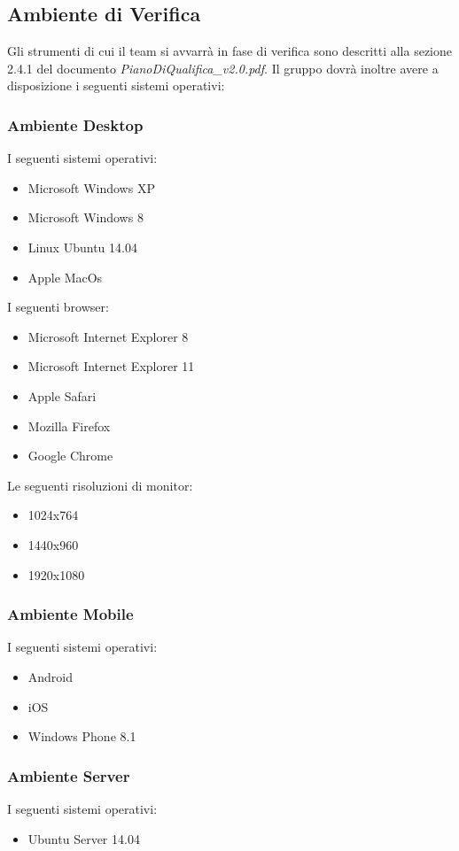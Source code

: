 \subsection{Ambiente di Verifica}
Gli strumenti di cui il team si avvarrà in fase di verifica sono descritti alla sezione 2.4.1 del documento \textit{PianoDiQualifica\_v2.0.pdf}.
Il gruppo dovrà inoltre avere a disposizione i seguenti sistemi operativi:

\subsubsection{Ambiente Desktop}
I seguenti sistemi operativi:
\begin{itemize}
\item Microsoft Windows XP
\item Microsoft Windows 8
\item Linux Ubuntu 14.04
\item Apple MacOs 
\end{itemize}
I seguenti browser:
\begin{itemize}
\item Microsoft Internet Explorer 8
\item Microsoft Internet Explorer 11
\item Apple Safari
\item Mozilla Firefox
\item Google Chrome
\end{itemize}
Le seguenti risoluzioni di monitor:
\begin{itemize}
\item 1024x764
\item 1440x960
\item 1920x1080
\end{itemize}

\subsubsection{Ambiente Mobile}
I seguenti sistemi operativi:
\begin{itemize}
\item Android
\item iOS
\item Windows Phone 8.1
\end{itemize}

\subsubsection{Ambiente Server}
I seguenti sistemi operativi:
\begin{itemize}
\item Ubuntu Server 14.04
\end{itemize}